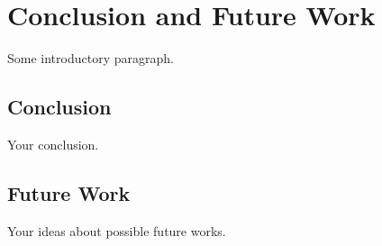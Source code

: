 
\chapter{Conclusion and Future Work}

Some introductory paragraph.


\section{Conclusion}

Your conclusion.


\section{Future Work}

Your ideas about possible future works.
